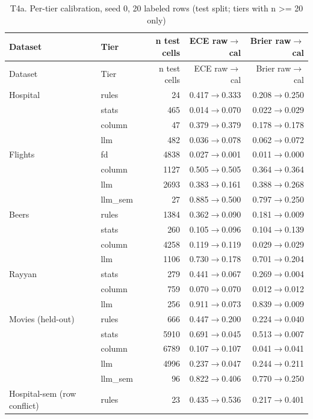 {\footnotesize
\begin{longtable}{llrrr}
\caption{T4a. Per-tier calibration, seed 0, 20 labeled rows (test split; tiers with n >= 20 only)}\label{tab:T4a}\\
\toprule
Dataset & Tier & n test cells & ECE raw$\to$cal & Brier raw$\to$cal \\
\midrule
\endfirsthead
\toprule
Dataset & Tier & n test cells & ECE raw$\to$cal & Brier raw$\to$cal \\
\midrule
\endhead
\bottomrule
\endfoot
Hospital & rules & 24 & 0.417$\to$0.333 & 0.208$\to$0.250 \\
 & stats & 465 & 0.014$\to$0.070 & 0.022$\to$0.029 \\
 & column & 47 & 0.379$\to$0.379 & 0.178$\to$0.178 \\
 & llm & 482 & 0.036$\to$0.078 & 0.062$\to$0.072 \\
\midrule
Flights & fd & 4838 & 0.027$\to$0.001 & 0.011$\to$0.000 \\
 & column & 1127 & 0.505$\to$0.505 & 0.364$\to$0.364 \\
 & llm & 2693 & 0.383$\to$0.161 & 0.388$\to$0.268 \\
 & llm\_sem & 27 & 0.885$\to$0.500 & 0.797$\to$0.250 \\
\midrule
Beers & rules & 1384 & 0.362$\to$0.090 & 0.181$\to$0.009 \\
 & stats & 260 & 0.105$\to$0.096 & 0.104$\to$0.139 \\
 & column & 4258 & 0.119$\to$0.119 & 0.029$\to$0.029 \\
 & llm & 1106 & 0.730$\to$0.178 & 0.701$\to$0.204 \\
\midrule
Rayyan & stats & 279 & 0.441$\to$0.067 & 0.269$\to$0.004 \\
 & column & 759 & 0.070$\to$0.070 & 0.012$\to$0.012 \\
 & llm & 256 & 0.911$\to$0.073 & 0.839$\to$0.009 \\
\midrule
Movies (held-out) & rules & 666 & 0.447$\to$0.200 & 0.224$\to$0.040 \\
 & stats & 5910 & 0.691$\to$0.045 & 0.513$\to$0.007 \\
 & column & 6789 & 0.107$\to$0.107 & 0.041$\to$0.041 \\
 & llm & 4996 & 0.237$\to$0.047 & 0.244$\to$0.211 \\
 & llm\_sem & 96 & 0.822$\to$0.406 & 0.770$\to$0.250 \\
\midrule
Hospital-sem (row conflict) & rules & 23 & 0.435$\to$0.536 & 0.217$\to$0.401 \\

\end{longtable}}
